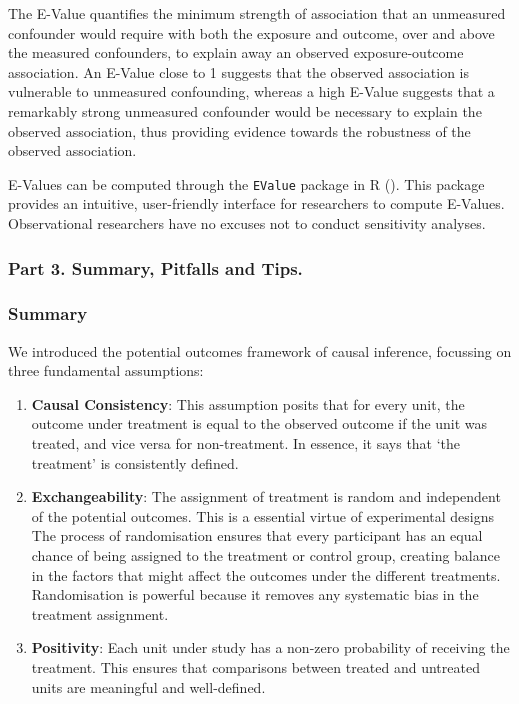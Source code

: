 \documentclass[
  singlecolumn]{article}
\begin{document}
The E-Value quantifies the minimum strength of association that an
unmeasured confounder would require with both the exposure and outcome,
over and above the measured confounders, to explain away an observed
exposure-outcome association. An E-Value close to 1 suggests that the
observed association is vulnerable to unmeasured confounding, whereas a
high E-Value suggests that a remarkably strong unmeasured confounder
would be necessary to explain the observed association, thus providing
evidence towards the robustness of the observed association.

E-Values can be computed through the \texttt{EValue} package in R
(). This package
provides an intuitive, user-friendly interface for researchers to
compute E-Values. Observational researchers have no excuses not to
conduct sensitivity analyses.

\subsubsection{Part 3. Summary, Pitfalls and
Tips.}\label{part-3.-summary-pitfalls-and-tips.}

\subsubsection{Summary}\label{summary}

We introduced the potential outcomes framework of causal inference,
focussing on three fundamental assumptions:

\begin{enumerate}
\def\labelenumi{\arabic{enumi}.}
\item
  \textbf{Causal Consistency}: This assumption posits that for every
  unit, the outcome under treatment is equal to the observed outcome if
  the unit was treated, and vice versa for non-treatment. In essence, it
  says that `the treatment' is consistently defined.
\item
  \textbf{Exchangeability}: The assignment of treatment is random and
  independent of the potential outcomes. This is a essential virtue of
  experimental designs The process of randomisation ensures that every
  participant has an equal chance of being assigned to the treatment or
  control group, creating balance in the factors that might affect the
  outcomes under the different treatments. Randomisation is powerful
  because it removes any systematic bias in the treatment assignment.
\item
  \textbf{Positivity}: Each unit under study has a non-zero probability
  of receiving the treatment. This ensures that comparisons between
  treated and untreated units are meaningful and well-defined.
\end{enumerate}
\end{document}
